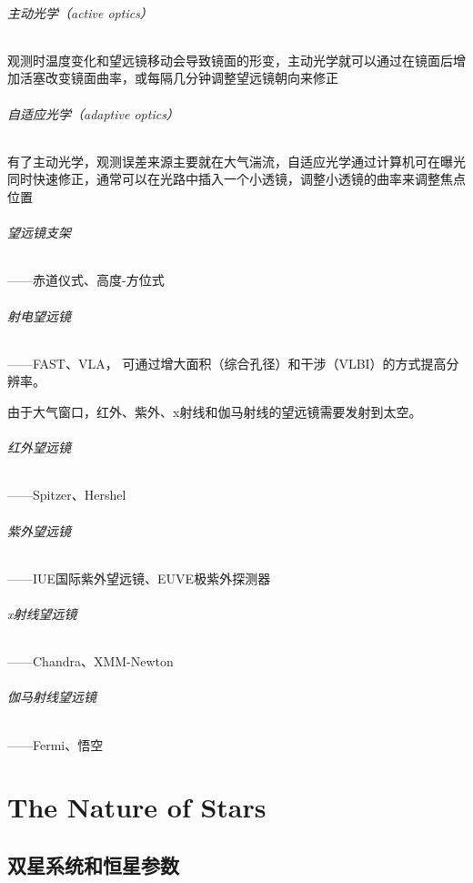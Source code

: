\documentclass[openany]{ctexbook}
\begin{document}
\paragraph{主动光学（active optics）}
观测时温度变化和望远镜移动会导致镜面的形变，主动光学就可以通过在镜面后增加活塞改变镜面曲率，或每隔几分钟调整望远镜朝向来修正

\paragraph{自适应光学（adaptive optics）}
有了主动光学，观测误差来源主要就在大气湍流，自适应光学通过计算机可在曝光同时快速修正，通常可以在光路中插入一个小透镜，调整小透镜的曲率来调整焦点位置

\paragraph{望远镜支架}——赤道仪式、高度-方位式

\paragraph{射电望远镜}——FAST、VLA，
可通过增大面积（综合孔径）和干涉（VLBI）的方式提高分辨率。
\newline

由于大气窗口，红外、紫外、x射线和伽马射线的望远镜需要发射到太空。
\paragraph{红外望远镜}——Spitzer、Hershel

\paragraph{紫外望远镜}——IUE国际紫外望远镜、EUVE极紫外探测器

\paragraph{x射线望远镜}——Chandra、XMM-Newton

\paragraph{伽马射线望远镜}——Fermi、悟空

\part{The Nature of Stars}
\chapter{双星系统和恒星参数}
\end{document}
